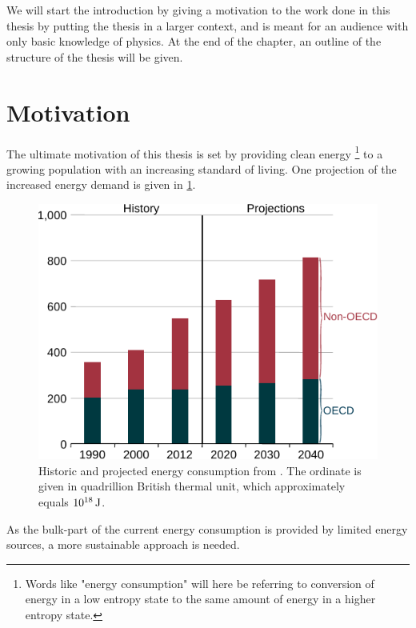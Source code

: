 %
We will start the introduction by giving a motivation to the work done in this thesis by putting the thesis in a larger context, and is meant for an audience with only basic knowledge of physics.
At the end of the chapter, an outline of the structure of the thesis will be given.

\section{Motivation}
%
The ultimate motivation of this thesis is set by providing clean energy%
\footnote{Words like "energy consumption" will here be referring to conversion of energy in a low entropy state to the same amount of energy in a higher entropy state.
}
%
to a growing population with an increasing standard of living.
One projection of the increased energy demand is given in \cref{fig:energyDemand}.
%
\begin{figure}[htb]
    \begin{center}
        \includegraphics{fig/intro/energyDemand}
    \end{center}
    \caption{Historic and projected energy consumption from \cite{UEIA2016book}.
    The ordinate is given in quadrillion British thermal unit, which approximately equals $10^{18} \, \text{J}$.
    }
    \label{fig:energyDemand}
\end{figure}

\noindent
As the bulk-part of the current energy consumption is provided by limited energy sources, a more sustainable approach is needed.

